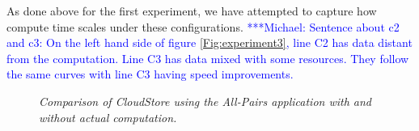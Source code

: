 \documentclass{rspublic}
\newcommand{\micnote}[1]{ {\textcolor{blue} { ***Michael: #1 }}}
\begin{document}
As done above for the first experiment, we have attempted to capture
how compute time scales under these configurations. \micnote{Sentence about c2 and c3: On
the left hand side of figure \ref{Fig:experiment3}, line C2 has data distant from the
computation. Line C3 has data mixed with some resources. They follow
the same curves with line C3 having speed improvements.} 
\begin{center}
\begin{figure}
\caption{\textit{Comparison of CloudStore using the All-Pairs
application with and without actual computation.}}
\label{Fig:experiment4}
\end{figure}
\end{center}
\end{document}
